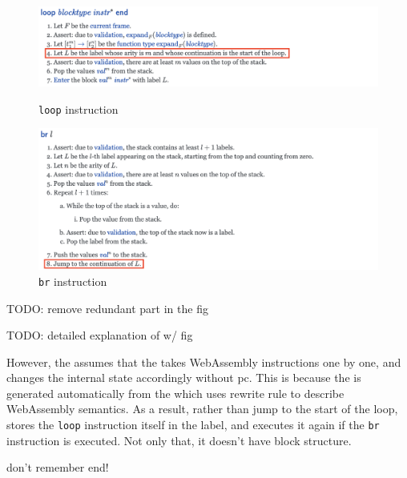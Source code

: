 \begin{figure}[h!]
    \centerline{\includegraphics[width=15cm]{fig/loop}}
    \caption[Enter the caption title here]{\texttt{loop} instruction} \label{loop-fig}
    \centerline{\includegraphics[width=15cm]{fig/br}}
    \caption[Enter the caption title here]{\texttt{br} instruction} \label{br-fig}
\end{figure}
TODO: remove redundant part in the fig

TODO: detailed explanation of \spectecp{} w/ fig

However, the \spectecp{} assumes that the  takes WebAssembly
instructions one by one, and changes the internal state accordingly without pc.
This is because the \spectecp{} is generated automatically from the 
which uses rewrite rule to describe WebAssembly semantics.
As a result, rather than jump to the start of the loop, \spectecp{} stores the
\texttt{loop} instruction itself in the label, and executes it again if the
\texttt{br} instruction is executed.
Not only that, it doesn't have block structure.

don't remember end!





